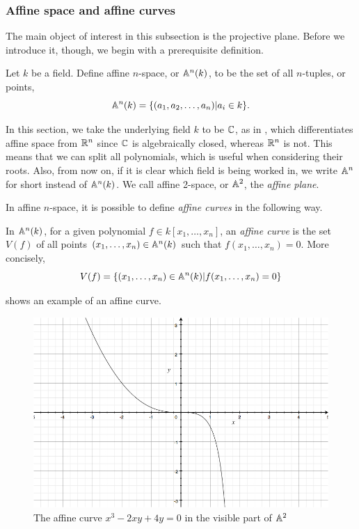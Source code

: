 \subsubsection{Affine space and affine curves}
The main object of interest in this subsection is the projective plane.
Before we introduce it, though, we begin with a prerequisite definition.

\begin{definition}
	Let $k$ be a field.
	Define affine $n$-space, or $\an(k)$, to be the set of all $n$-tuples, or points,
	$$\an(k) = \{ (a_1,a_2,\ldots,a_n) | a_i \in k\}.$$
\end{definition}

In this section, we take the underlying field $k$ to be $\C$, as in \cite{bix2006,323-lectures}, which differentiates affine space from $\R^n$ since $\C$ is algebraically closed, whereas $\R^n$ is not.
This means that we can split all polynomials, which is useful when considering their roots.
Also, from now on, if it is clear which field is being worked in, we write $\an$ for short instead of $\an(k)$.
We call affine 2-space, or $\an[2]$, the \emph{affine plane}.

In affine $n$-space, it is possible to define \emph{affine curves} in the following way.
\begin{definition}
	In $\an(k)$, for a given polynomial $f \in k[x_1,\ldots,x_n]$, an \emph{affine curve} is the set $V(f)$ of all points $(x_1,\ldots,x_n) \in \an(k)$ such that $f(x_1,\ldots,x_n)=0$.
	More concisely,
	$$V(f) = \{(x_1,\ldots,x_n)\in\an(k) | f(x_1,\ldots,x_n)=0\}$$
\end{definition}
 shows an example of an affine curve.

\begin{figure}[htbp]
	\centering
	\includegraphics[scale=0.3]{../Figures/affineexample.jpg}
	\caption{The affine curve $x^3 - 2xy + 4y = 0$ in the visible part of $\an[2]$}
	\label{affinecurveexample}
\end{figure}

